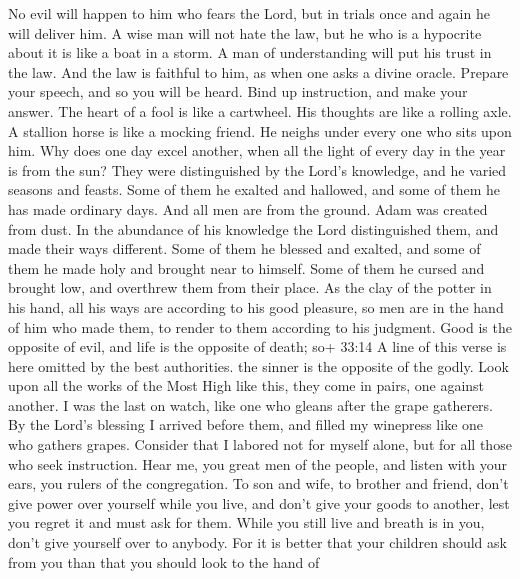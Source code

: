  No evil will happen to him who fears the Lord, but in
trials once and again he will deliver him.  A wise man will
not hate the law, but he who is a hypocrite about it is like a boat in a
storm.  A man of understanding will put his trust in the
law. And the law is faithful to him, as when one asks a divine oracle.
 Prepare your speech, and so you will be heard. Bind up
instruction, and make your answer.  The heart of a fool is
like a cartwheel. His thoughts are like a rolling axle.  A
stallion horse is like a mocking friend. He neighs under every one who
sits upon him.  Why does one day excel another, when all the
light of every day in the year is from the sun?  They were
distinguished by the Lord's knowledge, and he varied seasons and feasts.
 Some of them he exalted and hallowed, and some of them he
has made ordinary days.  And all men are from the ground.
Adam was created from dust.  In the abundance of his
knowledge the Lord distinguished them, and made their ways different.
 Some of them he blessed and exalted, and some of them he
made holy and brought near to himself. Some of them he cursed and
brought low, and overthrew them from their place.  As the
clay of the potter in his hand, all his ways are according to his good
pleasure, so men are in the hand of him who made them, to render to them
according to his judgment.  Good is the opposite of evil,
and life is the opposite of death; so+ 33:14 A line of this verse is
here omitted by the best authorities. the sinner is the opposite of the
godly.  Look upon all the works of the Most High like this,
they come in pairs, one against another.  I was the last on
watch, like one who gleans after the grape gatherers.  By
the Lord's blessing I arrived before them, and filled my winepress like
one who gathers grapes.  Consider that I labored not for
myself alone, but for all those who seek instruction.  Hear
me, you great men of the people, and listen with your ears, you rulers
of the congregation.  To son and wife, to brother and
friend, don't give power over yourself while you live, and don't give
your goods to another, lest you regret it and must ask for them.
 While you still live and breath is in you, don't give
yourself over to anybody.  For it is better that your
children should ask from you than that you should look to the hand of
